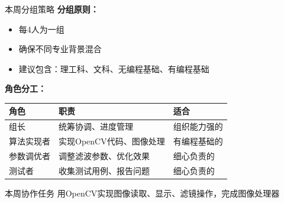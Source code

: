 \documentclass[aspectratio=169, 10pt]{beamer}
\begin{document}
\begin{frame}{本周分组策略}
    \textbf{分组原则：}
    \begin{itemize}
        \item 每4人为一组
        \item 确保不同专业背景混合
        \item 建议包含：理工科、文科、无编程基础、有编程基础
    \end{itemize}

    \vspace{0.3cm}

    \textbf{角色分工：}
    \begin{table}
        \centering
        \small
        \begin{tabular}{lp{6cm}l}
            \toprule
            \textbf{角色} & \textbf{职责} & \textbf{适合} \\
            \midrule
            组长 & 统筹协调、进度管理 & 组织能力强的 \\
            算法实现者 & 实现OpenCV代码、图像处理 & 有编程基础的 \\
            参数调优者 & 调整滤波参数、优化效果 & 细心负责的 \\
            测试者 & 收集测试用例、报告问题 & 细心负责的 \\
            \bottomrule
        \end{tabular}
    \end{table}

    \vspace{0.3cm}

    \begin{block}{本周协作任务}
        用OpenCV实现图像读取、显示、滤镜操作，完成图像处理器
    \end{block}
\end{frame}
\end{document}
